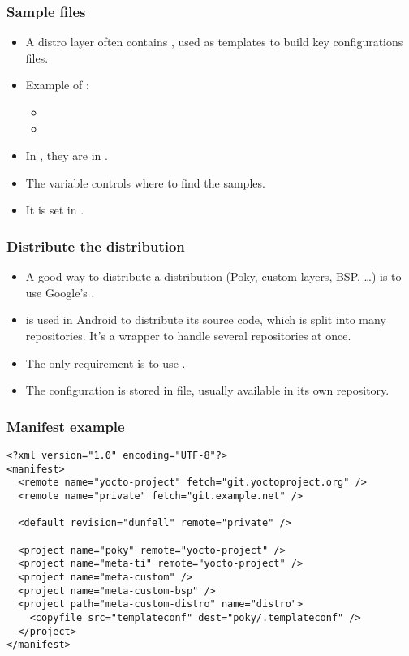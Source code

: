 \begin{frame}
  \frametitle{Sample files}
  \begin{itemize}
    \item A distro layer often contains , used as
      templates to build key configurations files.
    \item Example of :
      \begin{itemize}
        \item {}
        \item {}
      \end{itemize}
    \item In , they are in .
    \item The  variable controls where to find the
      samples.
    \item It is set in .
  \end{itemize}
\end{frame}

\begin{frame}
  \frametitle{Distribute the distribution}
  \begin{itemize}
    \item A good way to distribute a distribution (Poky, custom
      layers, BSP, \dots) is to use Google's
      .
    \item {} is used in Android to distribute its source
      code, which is split into many  repositories. It's a
      wrapper to handle several  repositories at once.
    \item The only requirement is to use .
    \item The  configuration is stored in 
      file, usually available in its own  repository.
  \end{itemize}
\end{frame}

\begin{frame}[fragile]
  \frametitle{Manifest example}
  \begin{verbatim}
<?xml version="1.0" encoding="UTF-8"?>
<manifest>
  <remote name="yocto-project" fetch="git.yoctoproject.org" />
  <remote name="private" fetch="git.example.net" />

  <default revision="dunfell" remote="private" />

  <project name="poky" remote="yocto-project" />
  <project name="meta-ti" remote="yocto-project" />
  <project name="meta-custom" />
  <project name="meta-custom-bsp" />
  <project path="meta-custom-distro" name="distro">
    <copyfile src="templateconf" dest="poky/.templateconf" />
  </project>
</manifest>
  \end{verbatim}
\end{frame}

